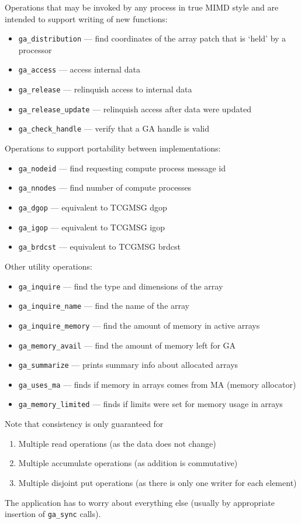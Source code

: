 Operations that may be invoked by any process in true MIMD style and
are intended to support writing of new functions:
\begin{itemize}
\item {\tt ga\_distribution} --- find coordinates of the array patch
  that is `held' by a processor
\item {\tt ga\_access} --- access internal data
\item {\tt ga\_release} --- relinquish access to internal data
\item {\tt ga\_release\_update} --- relinquish access after data were
  updated
\item {\tt ga\_check\_handle} --- verify that a GA handle is valid
\end{itemize}

Operations to support portability between implementations:
\begin{itemize}
\item {\tt ga\_nodeid} --- find requesting compute process message id
\item {\tt ga\_nnodes} --- find number of compute processes
\item {\tt ga\_dgop} --- equivalent to TCGMSG dgop
\item {\tt ga\_igop} --- equivalent to TCGMSG igop
\item {\tt ga\_brdcst} --- equivalent to TCGMSG brdcst
\end{itemize}

Other utility operations:
\begin{itemize}
\item {\tt ga\_inquire} --- find the type and dimensions of the array
\item {\tt ga\_inquire\_name} --- find the name of the array
\item {\tt ga\_inquire\_memory} --- find the amount of memory in
  active arrays
\item {\tt ga\_memory\_avail} --- find the amount of memory left for
  GA
\item {\tt ga\_summarize} --- prints summary info about allocated
  arrays
\item {\tt ga\_uses\_ma} --- finds if memory in arrays comes from MA
  (memory allocator)
\item {\tt ga\_memory\_limited} --- finds if limits were set for
  memory usage in arrays
\end{itemize}

Note that consistency is only guaranteed for
\begin{enumerate}
\item Multiple read operations (as the data does not change)
\item Multiple accumulate operations (as addition is commutative)
\item Multiple disjoint put operations (as there is only one writer
  for each element)
\end{enumerate}
The application has to worry about everything else (usually by
appropriate insertion of {\tt ga\_sync} calls).


